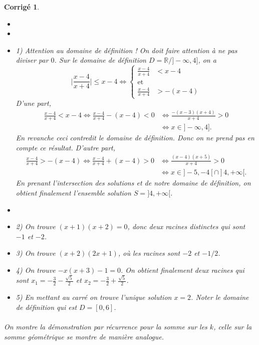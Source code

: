 \documentclass[11pt,french,table]{article}
\theoremstyle{exercice}
\theoremstyle{corrigé}
\newtheorem{corrigé}{Corrigé}
\begin{document}
\vspace{1em}
\begin{corrigé}
  \begin{itemize}
  \item[]
  \item[]
           \item 1) Attention au domaine de définition ! On doit faire attention à ne pas diviser par $0$. Sur le domaine de définition $D=\mathbb{R}/]-\infty, 4]$, on a 
           \begin{equation*}
               \bigg | \frac{x-4}{x+4}\bigg| \leq x-4 \Longleftrightarrow{} \left \{ \begin{matrix}
\frac{x-4}{x+4}&<x-4\\
\text{et}&\\
\frac{x-4}{x+4}&>-(x-4)
\end{matrix}
\right.
   \end{equation*}
D'une part, 
\begin{equation*}
    \begin{aligned}
    \frac{x-4}{x+4}<x-4 \Longleftrightarrow{}  \frac{x-4}{x+4}-(x-4)<0 & \Longleftrightarrow{}  \frac{-(x-3)(x+4)}{x+4}>0 \\
     & \Longleftrightarrow{} x\in ]-\infty,4]. 
    \end{aligned}
\end{equation*}
En revanche ceci contredit le domaine de définition. Donc on ne prend pas en compte ce résultat. 
D'autre part, \begin{equation*}
    \begin{aligned}
    \frac{x-4}{x+4}>-(x-4) \Longleftrightarrow{}  \frac{x-4}{x+4}+(x-4)>0 & \Longleftrightarrow{}  \frac{(x-4)(x+5)}{x+4}>0 \\
     & \Longleftrightarrow{} x\in ]-5,-4[ \cap ]4, +\infty[. 
    \end{aligned}
\end{equation*}
En prenant l'intersection des solutions et de notre domaine de définition, on obtient finalement l'ensemble solution $S=]4, + \infty[$. 
        \item[]
           \item 2)  On trouve $(x+1)(x+2)=0$, donc deux racines distinctes qui sont $-1$ et $-2$. 
           \item 3) On trouve $(x+2)(2x+1)$, où les racines sont $-2$ et $-1/2$. 
           \item 4) On trouve $-x(x+3)-1=0$. On obtient finalement deux racines qui sont $x_1=-\frac{3}{2}-\frac{\sqrt{5}}{2}$ et $x_2=-\frac{3}{2}+\frac{\sqrt{5}}{2}$.
           \item 5) En mettant au carré on trouve l'unique solution $x=2$. Noter le domaine de définition qui est $D=[0,6]$.  
       \end{itemize}  \paragraph{}
       On montre la démonstration par récurrence pour la somme sur les $k$, celle sur la somme géométrique se montre de manière analogue. 

\end{corrigé}
\end{document}
